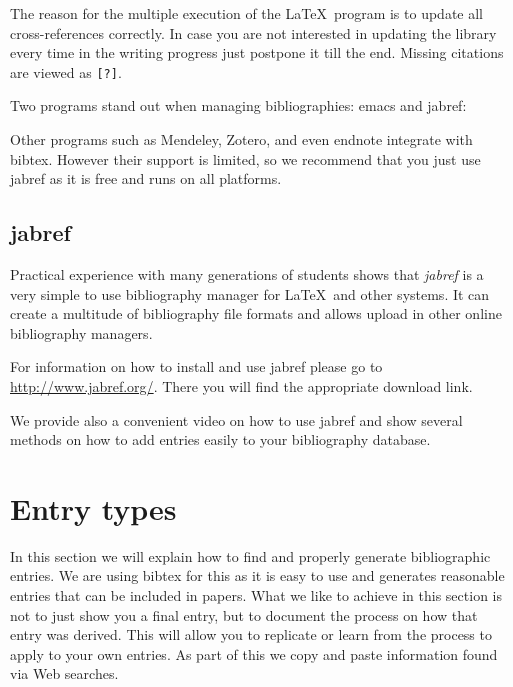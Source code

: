The reason for the multiple execution of the \LaTeX\ program is to update
all cross-references correctly. In case you are not interested in
updating the library every time in the writing progress just postpone it
till the end. Missing citations are viewed as \verb|[?]|.

Two programs stand out when managing bibliographies: emacs and jabref:


Other programs such as Mendeley, Zotero, and even endnote integrate with
bibtex. However their support is limited, so we recommend that you just
use jabref as it is free and runs on all platforms.

\subsection{jabref}\label{jabref}


Practical experience with many generations of students shows that
\textit{jabref} is a very simple to use bibliography manager for \LaTeX\ and
other systems. It can create a multitude of bibliography file formats
and allows upload in other online bibliography managers.

For information on how to install and use jabref please go to 
\url{http://www.jabref.org/}. There you will find the appropriate
download link.

We provide also a convenient video on how to use jabref and show
several methods on how to add entries easily to your bibliography database.




\section{Entry types}

In this section we will explain how to find and properly generate
bibliographic entries. We are using bibtex for this as it is easy to
use and generates reasonable entries that can be included in
papers. What we like to achieve in this section is not to just show
you a final entry, but to document the process on how that entry was
derived. This will allow you to replicate or learn from the process to
apply to your own entries. As part of this we copy and paste
information found via Web searches.

